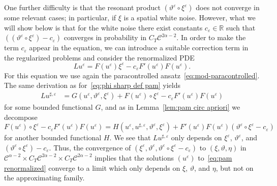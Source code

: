 \documentclass[11pt,a4paper]{article}
\theoremstyle{remark}
\newcommand{\CC}{\ensuremath{\mathscr{C}}}
\begin{document}
One further difficulty is that the resonant product $(\vartheta^{\varepsilon} \circ \xi^{\varepsilon} )$ does not converge in some
relevant cases; in particular, if $\xi$ is a spatial white noise. However, what we will show below is that for the white noise  there
exist constants $c_{\varepsilon} \in \mathbb{R}$ such that $((\vartheta^{\varepsilon} \circ \xi^{\varepsilon} ) -c_{\varepsilon})$ converges in probability
in $C_{T} \CC^{2 \alpha -2}$. In order to make the term $c_{\varepsilon}$
appear in the equation, we can introduce a suitable correction term in the
regularized problems and consider the renormalized PDE
\begin{equation}\label{eq:pam renormalized}
   L u^{\varepsilon} =F ( u^{\varepsilon} ) \xi^{\varepsilon} -c_{\varepsilon} F' ( u^{\varepsilon} ) F ( u^{\varepsilon} ) .
\end{equation}
For this equation we use again the paracontrolled ansatz~\eqref{eq:mod-paracontrolled}. The same derivation as for~\eqref{eq:phi sharp def pam} yields
\begin{align*}
   L u^{\sharp, \varepsilon} & = G(u^\varepsilon, \vartheta^\varepsilon, \xi^\varepsilon) + F(u^\varepsilon) \circ \xi^\varepsilon  - c_{\varepsilon} F' ( u^{\varepsilon} ) F ( u^{\varepsilon} )
\end{align*}
for some bounded functional $G$, and as in Lemma~\ref{lem:pam circ apriori} we decompose
\[
   F(u^\varepsilon) \circ \xi^\varepsilon  - c_{\varepsilon} F' ( u^{\varepsilon} ) F ( u^{\varepsilon} ) = H(u^\varepsilon,u^{\sharp,\varepsilon}, \vartheta^\varepsilon,\xi^\varepsilon) + F'(u^\varepsilon) F(u^\varepsilon) (\vartheta^\varepsilon \circ \xi^\varepsilon - c_\varepsilon)
\]
for another bounded functional $H$. 
We see that $Lu^{\sharp , \varepsilon}$ only depends on $\xi^{\varepsilon}$, $\vartheta^{\varepsilon}$, and $(\vartheta^{\varepsilon} \circ \xi^{\varepsilon} ) -c_{\varepsilon}$. Thus,
the convergence of $(\xi^\varepsilon,\vartheta^\varepsilon, \vartheta^{\varepsilon} \circ \xi^{\varepsilon} - c_\varepsilon)$ to $(\xi,\vartheta, \eta)$ in $\CC^{\alpha-2} \times C_{T} \CC^{2 \alpha -2} \times C_T \CC^{2\alpha-2}$ implies that the solutions $( u^{\varepsilon} )$ to~\eqref{eq:pam renormalized} converge to a limit which only depends on $\xi$, $\vartheta$, and $\eta$,
but not on the approximating family.
\end{document}
